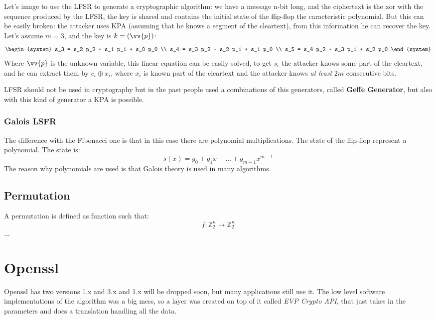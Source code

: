 \documentclass[12pt]{article}
\begin{document}
\hfill

Let's image to use the LFSR to generate a cryptographic algorithm: we have a message n-bit long, and the ciphertext is the xor with the sequence produced by the LFSR, the key is shared and contains the initial state of the flip-flop the caracteristic polynomial. But this can be easily broken: the attacker uses KPA (assuming that he knows a segment of the cleartext), from this information he can recover the key. Let's assume $m=3$, and the key is $k=(\vv{p})$:
\[
  \begin{system} 
    s_3 = s_2 p_2 + s_1 p_1 + s_0 p_0 \\
    s_4 = s_3 p_2 + s_2 p_1 + s_1 p_0 \\
    s_5 = s_4 p_2 + s_3 p_1 + s_2 p_0
  \end{system} 
\]
Where $\vv{p}$ is the unknown variable, this linear equation can be easily solved, to get $s_i$ the attacker knows some part of the cleartext, and he can extract them by $c_i \oplus x_i$, where $x_i$ is known part of the cleartext and the attacker knows \emph{at least} $2m$ consecutive bits.

LFSR should not be used in cryptography but in the past people used a combinations of this generators, called \textbf{Geffe Generator}, but also with this kind of generator a KPA is possible.


\subsubsection{Galois LSFR}
The difference with the Fibonacci one is that in this case there are polynomial multiplications. The state of the flip-flop represent a polynomial. The state is:
\[ s(x) = g_0 + g_1x + \dots + g_{m-1}x^{m-1} \]
The reason why polynomials are used is that Galois theory is used in many algorithms.



\subsection{Permutation}
A permutation is defined as function such that:
\[ f: \mathbb{Z}_2^n \rightarrow \mathbb{Z}_2^n \]
...













\newpage
\section{Openssl}
Openssl has two versions 1.x and 3.x and 1.x will be dropped soon, but many applications still use it. The low level software implementations of the algorithm was a big mess, so a layer was created on top of it called \emph{EVP Crypto API}, that just takes in the parameters and does a translation handling all the data.
\end{document}
